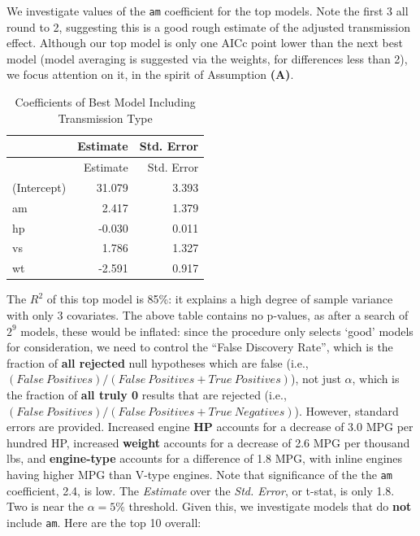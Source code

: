 \documentclass[]{article}
\begin{document}
We investigate values of the \texttt{am} coefficient for the top models.
Note the first 3 all round to 2, suggesting this is a good rough
estimate of the adjusted transmission effect. Although our top model is
only one AICc point lower than the next best model (model averaging is
suggested via the weights, for differences less than 2), we focus
attention on it, in the spirit of Assumption \textbf{(A)}.

\begin{longtable}[]{@{}lrr@{}}
\caption{Coefficients of Best Model Including Transmission
Type}\tabularnewline
\toprule
& Estimate & Std. Error\tabularnewline
\midrule
\endfirsthead
\toprule
& Estimate & Std. Error\tabularnewline
\midrule
\endhead
(Intercept) & 31.079 & 3.393\tabularnewline
am & 2.417 & 1.379\tabularnewline
hp & -0.030 & 0.011\tabularnewline
vs & 1.786 & 1.327\tabularnewline
wt & -2.591 & 0.917\tabularnewline
\bottomrule
\end{longtable}

The \(R^2\) of this top model is 85\%: it explains a high degree of
sample variance with only 3 covariates. The above table contains no
p-values, as after a search of \(2^9\) models, these would be inflated:
since the procedure only selects `good' models for consideration, we
need to control the ``False Discovery Rate'', which is the fraction of
\textbf{all rejected} null hypotheses which are false (i.e.,
\((False~Positives)/(False~ Positives + True~ Positives)\)), not just
\(\alpha\), which is the fraction of \textbf{all truly 0} results that
are rejected (i.e.,
\((False~Positives)/(False~ Positives + True~ Negatives)\)). However,
standard errors are provided. Increased engine \textbf{HP} accounts for
a decrease of 3.0 MPG per hundred HP, increased \textbf{weight} accounts
for a decrease of 2.6 MPG per thousand lbs, and \textbf{engine-type}
accounts for a difference of 1.8 MPG, with inline engines having higher
MPG than V-type engines. Note that significance of the the \texttt{am}
coefficient, 2.4, is low. The \emph{Estimate} over the \emph{Std.
Error}, or t-stat, is only 1.8. Two is near the \(\alpha=5\%\)
threshold. Given this, we investigate models that do \textbf{not}
include \texttt{am}. Here are the top 10 overall:
\end{document}
